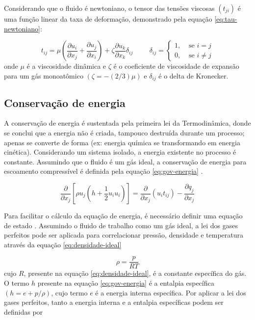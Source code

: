 Considerando que o fluido é newtoniano, o tensor das tensões viscosas \(\left(t_{ji}\right)\) é uma função linear da taxa de deformação, demonstrado pela equação \ref{eq:tau-newtoniano}:

\begin{equation}
    \label{eq:tau-newtoniano}
    t_{ij} = \mu \left(\frac{\partial u_i}{\partial x_j} + \frac{\partial u_j}{\partial x_i} \right) + \zeta\frac{\partial u_k}{\partial x_k}\delta_{ij} \hspace{1cm} 
    \delta_{ij} =
        \begin{cases}
            1,& \text{ se $i = j$} \\
            0,& \text{ se $i \neq j$}
        \end{cases}
\end{equation}
%
onde \(\mu\) é a viscosidade dinâmica e \(\zeta\) é o coeficiente de viscosidade de expansão para um gás monoatômico \(\left(\zeta = -(2/3)\mu\right)\) e \(\delta_{ij}\) é o delta de Kronecker. 

\subsection{Conservação de energia}

A conservação de energia é sustentada pela primeira lei da Termodinâmica, donde se conclui que a energia não é criada, tampouco destruída durante um processo; apenas se converte de forma (ex: energia química se transformando em energia cinética). Considerando um sistema isolado, a energia existente no processo é constante. Assumindo que o fluido é um gás ideal, a conservação de energia para escoamento compressível é definida pela equação \ref{eq:gov-energia} \cite{Moukalled2015, Wilcox2006}.

\begin{equation}
    \label{eq:gov-energia}
   \frac{\partial}{\partial x_j}\left[\rho u_j\left(h + \frac{1}{2}u_i u_i \right)\right] = \frac{\partial}{\partial x_j}\left(u_i t_{ij}\right) - \frac{\partial q_j}{\partial x_j}
\end{equation}

Para facilitar o cálculo da equação de energia, é necessário definir uma equação de estado \cite{Wilcox2006}. Assumindo o fluido de trabalho como um gás ideal, a lei dos gases perfeitos pode ser aplicada para correlacionar pressão, densidade e temperatura através da equação \ref{eq:densidade-ideal}

\begin{equation}
    \label{eq:densidade-ideal}
    \rho = \frac{p}{RT}
\end{equation}
%
cujo \(R\), presente na equação \ref{eq:densidade-ideal}, é a constante específica do gás. O termo \(h\) presente na equação \ref{eq:gov-energia} é a entalpia específica \(\left(h = e + p/\rho\right)\), cujo termo \(e\) é a energia interna específica. Por aplicar a lei dos gases perfeitos, tanto a energia interna e a entalpia específicas podem ser definidas por

